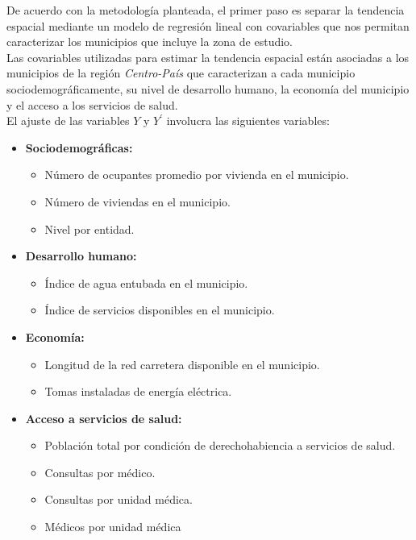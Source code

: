 \documentclass[11pt, oneside]{book}
\begin{document}
De acuerdo con la metodología planteada, el primer paso es separar la tendencia espacial mediante un modelo de regresión lineal con covariables que nos permitan caracterizar los municipios que incluye la zona de estudio.\\

Las covariables utilizadas para estimar la tendencia espacial están asociadas a los municipios de la región \emph{Centro-País} que caracterizan a cada municipio sociodemográficamente, su nivel de desarrollo humano, la economía del municipio y el acceso a los servicios de salud.\\

El ajuste de las variables $Y$ y $Y^{'}$ involucra las siguientes variables:

\begin{itemize}
  \item \textbf{Sociodemográficas:}
  \begin{itemize}
	  \item Número de ocupantes promedio por vivienda en el municipio.
	  \item Número de viviendas en el municipio.
	  \item Nivel por entidad.
  \end{itemize}
  \item \textbf{Desarrollo humano:}
  \begin{itemize}
	  \item Índice de agua entubada en el municipio.
	  \item Índice de servicios disponibles en el municipio.
  \end{itemize}
  \item \textbf{Economía:}
  \begin{itemize}
	  \item Longitud de la red carretera disponible en el municipio.
	  \item Tomas instaladas de energía eléctrica.
  \end{itemize}  
  \item \textbf{Acceso a servicios de salud:}
  \begin{itemize}
	  \item Población total por condición de derechohabiencia a servicios de salud.
	  \item Consultas por médico.
	  \item Consultas por unidad médica.
	  \item Médicos por unidad médica
  \end{itemize}  
\end{itemize}
\end{document}
